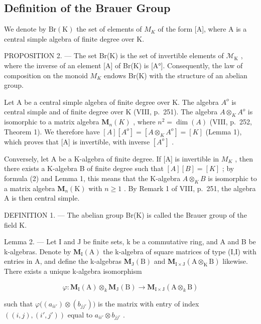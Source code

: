 \subsection{Definition of the Brauer Group}

We denote by \(\mathrm{Br}(\mathrm{K})\) the set of elements of \(M_{K}\) of the form {[}A{]}, where A is a central simple algebra of finite degree over K.

PROPOSITION 2. --- The set Br(K) is the set of invertible elements of \(\mathcal{M}_{\mathrm{K}}\) , where the inverse of an element {[}A{]} of Br(K) is {[}A°{]}. Consequently, the law of composition on the monoid \(M_{K}\) endows Br(K) with the structure of an abelian group.

Let A be a central simple algebra of finite degree over K. The algebra \(A^{o}\) is central simple and of finite degree over K (VIII, p.~251). The algebra \(A \otimes_{K} A^{o}\) is isomorphic to a matrix algebra \(\mathbf{M}_{n}(K)\) , where \(n^{2} = \dim(A)\) (VIII, p.~252, Theorem 1). We therefore have \([A][A^{o}] = [A \otimes_{K} A^{o}] = [K]\) (Lemma 1), which proves that {[}A{]} is invertible, with inverse \([A^{o}]\) .

Conversely, let A be a K-algebra of finite degree. If {[}A{]} is invertible in \(M_{K}\) , then there exists a K-algebra B of finite degree such that \([A][B]=[K]\) ; by formula (2) and Lemma 1, this means that the K-algebra \(A \otimes_{K} B\) is isomorphic to a matrix algebra \(\mathbf{M}_{n}(\mathrm{K})\) with \(n \geqslant 1\) . By Remark 1 of VIII, p.~251, the algebra A is then central simple.

DEFINITION 1. --- The abelian group Br(K) is called the Brauer group of the field K.

Lemma 2. --- Let I and J be finite sets, k be a commutative ring, and A and B be k-algebras. Denote by \(\mathbf{M}_{\mathrm{I}}(\mathrm{A})\) the k-algebra of square matrices of type (I,I) with entries in A, and define the k-algebras \(\mathbf{M}_{\mathrm{J}}(\mathrm{B})\) and \(\mathbf{M}_{\mathrm{I}\times\mathrm{J}}(\mathrm{A}\otimes_{\mathrm{K}}\mathrm{B})\) likewise. There exists a unique k-algebra isomorphism

\[
\varphi : \mathbf {M} _ {\mathrm{I}} (\mathrm{A}) \otimes_ {k} \mathbf {M} _ {\mathrm{J}} (\mathrm{B}) \longrightarrow \mathbf {M} _ {\mathrm{I} \times \mathrm{J}} (\mathrm{A} \otimes_ {k} \mathrm{B})
\]

such that \(\varphi\big((a_{ii'})\otimes(b_{jj'})\big)\) is the matrix with entry of index \(((i,j),(i',j'))\) equal to \(a_{ii'}\otimes b_{jj'}\) .

